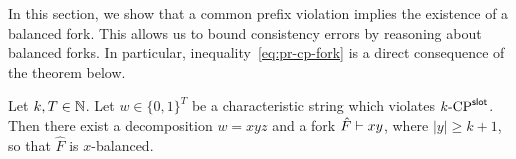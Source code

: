 In this section, we show that a common prefix violation implies the
existence of a balanced fork. This allows us to bound consistency
errors by reasoning about balanced forks.  In particular,
inequality~\eqref{eq:pr-cp-fork} is a direct consequence of the
theorem below.

\begin{theorem}\label{thm:cp-fork}
  Let $k, T \in \mathbb{N}$.  
  Let $w \in \{0,1\}^T$ be a characteristic string which violates ${k}\text{-}\mathrm{CP}^{\mathsf{slot}}$. 
  Then 
  there exist a decomposition $w = xyz$ and a fork $\hat{F} \vdash xy$, 
  where $|y| \geq k + 1$, 
  so that $\hat{F}$ is $x$-balanced. 
\end{theorem}

\newcommand{\Final}[1]{\tilde{#1}}

